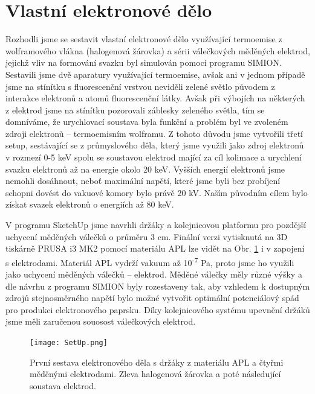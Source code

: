 \section{Vlastní elektronové dělo}
Rozhodli jsme se sestavit vlastní elektronové dělo využívající termoemise z wolframového vlákna (halogenová žárovka) a sérii válečkových měděných elektrod, jejichž vliv na formování svazku byl simulován pomocí programu SIMION. Sestavili jsme dvě aparatury využívající termoemise, avšak ani v jednom případě jsme na stínítku s fluorescenční vrstvou neviděli zelené světlo původem z interakce elektronů a atomů fluorescenční látky. Avšak při výbojích na některých z elektrod jsme na stínítku pozorovali záblesky zeleného světla, tím se domníváme, že urychlovací soustava byla funkční a problém byl ve zvoleném zdroji elektronů -- termoemisním wolframu. Z tohoto důvodu jsme vytvořili třetí setup, sestávající se z průmyslového děla, který jsme využili jako zdroj elektronů v rozmezí 0-5 keV spolu se soustavou elektrod mající za cíl kolimace a urychlení svazku elektronů až na energie okolo 20 keV. Vyšších energií elektronů jsme nemohli dosáhnout, neboť maximální napětí, které jsme byli bez probíjení schopni dovést do vakuové komory bylo právě 20 kV. Naším původním cílem bylo získat svazek elektronů o energiích až 80 keV.
\par V programu SketchUp jsme navrhli držáky a kolejnicovou platformu pro pozdější uchycení měděných válečků o průměru 3 cm. Finální verzi vytisknutá na 3D tiskárně PRUSA i3 MK2 pomocí materiálu APL lze vidět na Obr. \ref{SetUp} i v zapojení s elektrodami. Materiál APL vydrží vakuum až 10\textsuperscript{-7} Pa, proto jsme ho využili jako uchycení měděných válečků -- elektrod. Měděné válečky měly různé výšky a dle návrhu z programu SIMION byly rozestaveny tak, aby vzhledem k dostupným zdrojů stejnosměrného napětí bylo možné vytvořit optimální potenciálový spád pro produkci elektronového paprsku. Díky kolejnicového systému upevnění držáků jsme měli zaručenou souosost válečkových elektrod.
\begin{figure}[htbp!]
	\centering
	\texttt{[image: SetUp.png]}
	\caption{První sestava elektronového děla s držáky z materiálu APL a čtyřmi měděnými elektrodami. Zleva halogenová žárovka a poté následující soustava elektrod.}
	\label{SetUp}
\end{figure}

